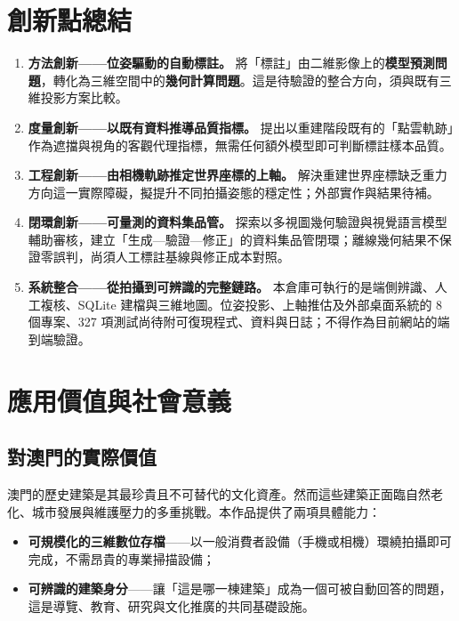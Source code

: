 \documentclass[11pt,a4paper,fontset=windows]{ctexart}
\newcommand{\key}[1]{\textbf{\color{ink}#1}}
\newcommand{\hl}[1]{\textbf{\color{gold}#1}}
\begin{document}
\section{創新點總結}

\begin{enumerate}[leftmargin=1.6em,itemsep=4pt]
\item \hl{方法創新——位姿驅動的自動標註。}
將「標註」由二維影像上的\textbf{模型預測問題}，轉化為三維空間中的\textbf{幾何計算問題}。這是待驗證的整合方向，須與既有三維投影方案比較。

\item \hl{度量創新——以既有資料推導品質指標。}
提出以重建階段既有的「點雲軌跡」作為遮擋與視角的客觀代理指標，無需任何額外模型即可判斷標註樣本品質。

\item \hl{工程創新——由相機軌跡推定世界座標的上軸。}
解決重建世界座標缺乏重力方向這一實際障礙，擬提升不同拍攝姿態的穩定性；外部實作與結果待補。

\item \hl{閉環創新——可量測的資料集品管。}
探索以多視圖幾何驗證與視覺語言模型輔助審核，建立「生成—驗證—修正」的資料集品管閉環；離線幾何結果不保證零誤判，尚須人工標註基線與修正成本對照。

\item \hl{系統整合——從拍攝到可辨識的完整鏈路。}
本倉庫可執行的是端側辨識、人工複核、SQLite 建檔與三維地圖。位姿投影、上軸推估及外部桌面系統的 8 個專案、327 項測試尚待附可復現程式、資料與日誌；不得作為目前網站的端到端驗證。
\end{enumerate}

\section{應用價值與社會意義}

\subsection{對澳門的實際價值}

澳門的歷史建築是其最珍貴且不可替代的文化資產。然而這些建築正面臨自然老化、城市發展與維護壓力的多重挑戰。本作品提供了兩項具體能力：

\begin{itemize}[leftmargin=1.5em,itemsep=2pt]
\item \key{可規模化的三維數位存檔}——以一般消費者設備（手機或相機）環繞拍攝即可完成，不需昂貴的專業掃描設備；
\item \key{可辨識的建築身分}——讓「這是哪一棟建築」成為一個可被自動回答的問題，這是導覽、教育、研究與文化推廣的共同基礎設施。
\end{itemize}
\end{document}
